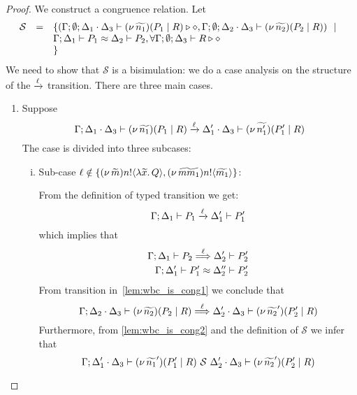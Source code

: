 \begin{proof}
	\noi We construct a congruence relation. Let
	\[
	\begin{array}{rcl}
		\mathcal{S} &=&	\{
				(\Gamma; \emptyset; \Delta_1 \cdot \Delta_3 \vdash (\nu\, \widetilde{n_1})(P_1 \;|\; R) \triangleright \diamond,
				\Gamma; \emptyset; \Delta_2 \cdot \Delta_3 \vdash (\nu\, \widetilde{n_2})(P_2 \;|\; R))
				\ \ |\ \  \\
		& &		\Gamma; \Delta_1 \vdash P_1 \approx \Delta_2 \vdash P_2, \forall \Gamma; \emptyset; \Delta_3 \vdash R \triangleright \diamond\\
		& &\}
	\end{array}
	\]
	\noi We need to show that 
	$\mathcal{S}$ is a bisimulation:  we do a case analysis on the structure
	of the $\xrightarrow{\ell}$ transition. There are three main cases.


	\begin{enumerate}

		\item Suppose
				\[
					\Gamma; \Delta_1 \cdot \Delta_3 \vdash (\nu\, \widetilde{n_1})(P_1 \;|\; R) \xrightarrow{\ell} \Delta_1' \cdot \Delta_3 \vdash (\nu\, \widetilde{n_1'})(P_1' \;|\; R)
				\]
				\noi The case is divided into three subcases:

				\begin{enumerate}[i.]
					\item Sub-case	$\ell \notin \{(\nu\, \widetilde{m}) n ! \langle \lambda \widetilde{x}.\,Q \rangle, (\nu\, \widetilde{mm_1}) n ! \langle \widetilde{m_1} \rangle\}$:
					
							\noi From the definition of typed transition we get:
							\[
								\Gamma; \Delta_1 \vdash P_1 \xrightarrow{\ell} \Delta_1' \vdash P_1'
							\]
							\noi which implies that
							\begin{eqnarray}
								\Gamma; \Delta_1 \vdash P_2 \stackrel{\ell}{\Longrightarrow} \Delta_2' \vdash P_2'
								\label{lem:wbc_is_cong1}\\
								\Gamma; \Delta_1' \vdash P_1' \approx \Delta_2'' \vdash P_2'
								\label{lem:wbc_is_cong2}
							\end{eqnarray}
							\noi From transition in~\eqref{lem:wbc_is_cong1} we conclude that 
							\[
								\Gamma; \Delta_2 \cdot \Delta_3 \vdash (\nu\, \widetilde{n_2})(P_2 \;|\; R) \stackrel{\ell}{\Longrightarrow} \Delta_2' \cdot \Delta_3 \vdash (\nu\, \widetilde{n_2}')(P_2' \;|\; R)
							\]
							\noi Furthermore, from \eqref{lem:wbc_is_cong2} and the definition of $\mathcal{S}$ we infer that
							\[
								\Gamma; \Delta_1' \cdot \Delta_3 \vdash (\nu\, \widetilde{n_1}')(P_1' \;|\; R) \ \mathcal{S}\  \Delta_2' \cdot \Delta_3 \vdash (\nu\, \widetilde{n_2}')(P_2' \;|\; R)
							\]


\end{enumerate}
\end{enumerate}
\end{proof}
